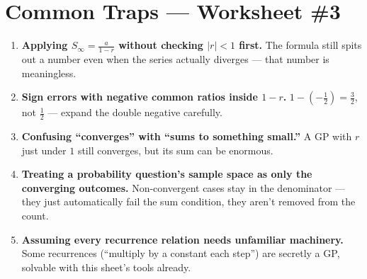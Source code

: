 \documentclass[11pt,a4paper]{article}
\begin{document}
\section*{Common Traps --- Worksheet \#3}
\begin{enumerate}[leftmargin=2em,itemsep=4pt]
  \item \textbf{Applying $S_\infty=\frac a{1-r}$ without checking $|r|<1$ first.} The formula still spits out a number even when the series actually diverges --- that number is meaningless. 
  \item \textbf{Sign errors with negative common ratios inside $1-r$.} $1-(-\frac12)=\frac32$, not $\frac12$ --- expand the double negative carefully. 
  \item \textbf{Confusing ``converges'' with ``sums to something small.''} A GP with $r$ just under $1$ still converges, but its sum can be enormous. 
  \item \textbf{Treating a probability question's sample space as only the converging outcomes.} Non-convergent cases stay in the denominator --- they just automatically fail the sum condition, they aren't removed from the count. 
  \item \textbf{Assuming every recurrence relation needs unfamiliar machinery.} Some recurrences (``multiply by a constant each step'') are secretly a GP, solvable with this sheet's tools already. 
\end{enumerate}

\end{document}
